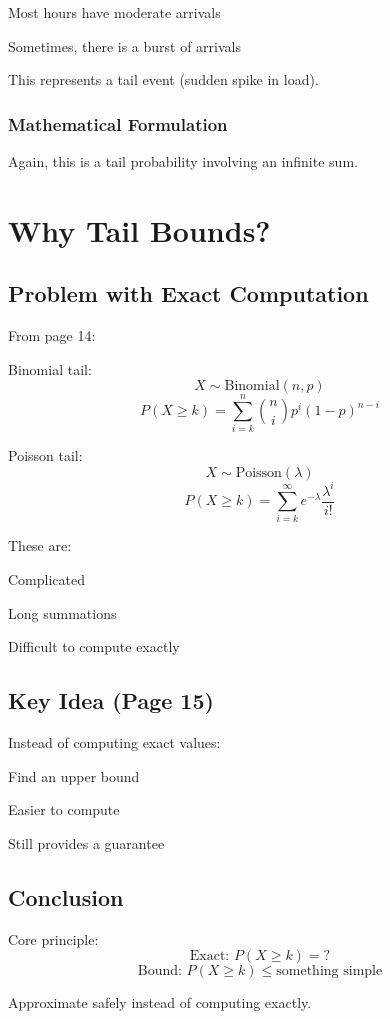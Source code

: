 \documentclass[11pt]{article}
\begin{document}
Most hours have moderate arrivals

Sometimes, there is a burst of arrivals

This represents a tail event (sudden spike in load).

\subsubsection{Mathematical Formulation}

Again, this is a tail probability involving an infinite sum.

\section{Why Tail Bounds?}

\subsection{Problem with Exact Computation}

From page 14:

Binomial tail:
\[
X \sim \text{Binomial}(n, p)
\]
\[
P(X \geq k) = \sum_{i=k}^{n} \binom{n}{i} p^i (1 - p)^{n-i}
\]

Poisson tail:
\[
X \sim \text{Poisson}(\lambda)
\]
\[
P(X \geq k) = \sum_{i=k}^{\infty} e^{-\lambda} \frac{\lambda^i}{i!}
\]

These are:

Complicated

Long summations

Difficult to compute exactly

\subsection{Key Idea (Page 15)}

Instead of computing exact values:

Find an upper bound

Easier to compute

Still provides a guarantee

\subsection{Conclusion}

Core principle:
\[
\text{Exact: } P(X \geq k) = ?
\]
\[
\text{Bound: } P(X \geq k) \leq \text{something simple}
\]

Approximate safely instead of computing exactly.
\end{document}
